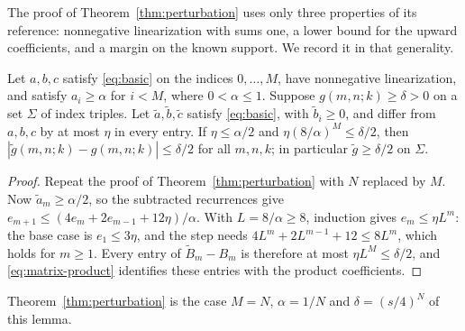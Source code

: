 The proof of Theorem~\ref{thm:perturbation} uses only three properties of its reference: nonnegative linearization with sums one, a lower bound for the upward coefficients, and a margin on the known support. We record it in that generality.

\begin{lemma}\label{lem:stability}
Let $a,b,c$ satisfy \eqref{eq:basic} on the indices $0,\ldots,M$, have nonnegative linearization, and satisfy $a_i\geq\alpha$ for $i<M$, where $0<\alpha\leq1$. Suppose $g(m,n;k)\geq\delta>0$ on a set $\Sigma$ of index triples. Let $\widetilde a,\widetilde b,\widetilde c$ satisfy \eqref{eq:basic}, with $\widetilde b_i\geq0$, and differ from $a,b,c$ by at most $\eta$ in every entry. If $\eta\leq\alpha/2$ and $\eta(8/\alpha)^M\leq\delta/2$, then $|\widetilde g(m,n;k)-g(m,n;k)|\leq\delta/2$ for all $m,n,k$; in particular $\widetilde g\geq\delta/2$ on $\Sigma$.
\end{lemma}
\begin{proof}
Repeat the proof of Theorem~\ref{thm:perturbation} with $N$ replaced by $M$. Now $\widetilde a_m\geq\alpha/2$, so the subtracted recurrences give $e_{m+1}\leq(4e_m+2e_{m-1}+12\eta)/\alpha$. With $L=8/\alpha\geq8$, induction gives $e_m\leq\eta L^m$: the base case is $e_1\leq3\eta$, and the step needs $4L^m+2L^{m-1}+12\leq8L^m$, which holds for $m\geq1$. Every entry of $\widetilde B_m-B_m$ is therefore at most $\eta L^M\leq\delta/2$, and \eqref{eq:matrix-product} identifies these entries with the product coefficients.
\end{proof}

Theorem~\ref{thm:perturbation} is the case $M=N$, $\alpha=1/N$ and $\delta=(s/4)^N$ of this lemma.

